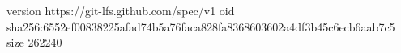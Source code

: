 version https://git-lfs.github.com/spec/v1
oid sha256:6552ef00838225afad74b5a76faca828fa8368603602a4df3b45c6ecb6aab7c5
size 262240
